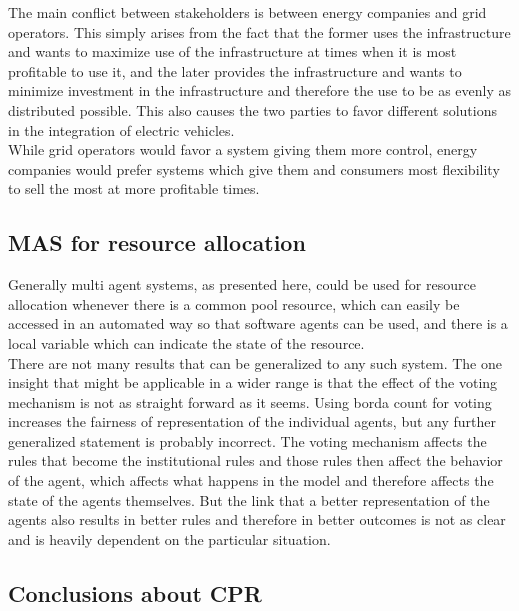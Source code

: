 \documentclass[a4paper]{article}
\begin{document}
The main conflict between stakeholders is between energy companies and grid operators. This simply arises from the 
fact that the former uses the infrastructure and wants to maximize use of the infrastructure at times when it is 
most profitable to use it, and the later provides the infrastructure and wants to minimize investment in the infrastructure
and therefore the use to be as evenly as distributed possible. This also causes the two parties to favor 
different solutions in the integration of electric vehicles. \\
While grid operators would favor a system giving them more control, energy companies would prefer systems which give 
them and consumers most flexibility to sell the most at more profitable times. 

\subsection{MAS for resource allocation}
Generally multi agent systems, as presented here, could be used for resource allocation whenever there 
is a common pool resource, which can 
easily be accessed in an automated way so that software agents can be used, and there is a local
variable which can indicate the state of the resource. \\
There are not many results that can be generalized to any such system. The one insight that might be applicable in a wider range is 
that the effect of the voting mechanism is not as straight forward as it seems. Using borda count for voting increases the 
fairness of representation of the individual agents, but any further generalized statement is probably incorrect. The voting 
mechanism affects the rules that become the institutional rules and those rules then affect the
behavior of the agent, which affects what happens in the model  and therefore affects the state of
the agents themselves. But the link that a better representation of the agents also results in better 
rules and therefore in better 
outcomes is not as clear and is heavily dependent on the particular situation. 

\subsection{Conclusions about CPR}
\end{document}
